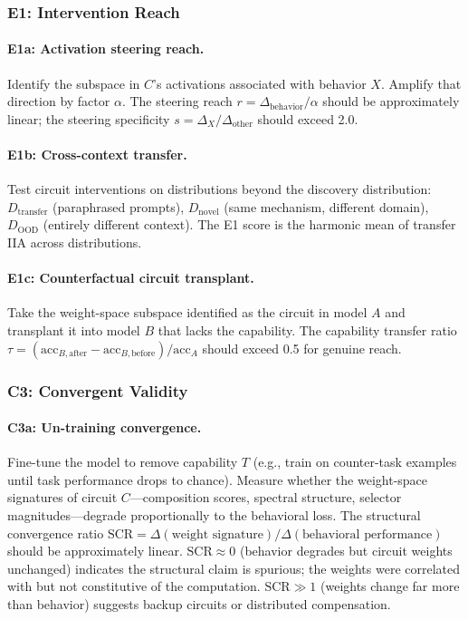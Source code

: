 \documentclass{article}
\begin{document}
\subsubsection{E1: Intervention Reach}

\paragraph{E1a: Activation steering reach.} Identify the subspace in $C$'s activations associated with behavior $X$. Amplify that direction by factor $\alpha$. The steering reach $r = \Delta_{\text{behavior}} / \alpha$ should be approximately linear; the steering specificity $s = \Delta_X / \Delta_{\text{other}}$ should exceed 2.0.

\paragraph{E1b: Cross-context transfer.} Test circuit interventions on distributions beyond the discovery distribution: $D_{\text{transfer}}$ (paraphrased prompts), $D_{\text{novel}}$ (same mechanism, different domain), $D_{\text{OOD}}$ (entirely different context). The E1 score is the harmonic mean of transfer IIA across distributions.

\paragraph{E1c: Counterfactual circuit transplant.} Take the weight-space subspace identified as the circuit in model $A$ and transplant it into model $B$ that lacks the capability. The capability transfer ratio $\tau = (\text{acc}_{B,\text{after}} - \text{acc}_{B,\text{before}}) / \text{acc}_A$ should exceed 0.5 for genuine reach.

\subsubsection{C3: Convergent Validity}

\paragraph{C3a: Un-training convergence.} Fine-tune the model to remove capability $T$ (e.g., train on counter-task examples until task performance drops to chance). Measure whether the weight-space signatures of circuit $C$---composition scores, spectral structure, selector magnitudes---degrade proportionally to the behavioral loss. The structural convergence ratio $\text{SCR} = \Delta(\text{weight signature}) / \Delta(\text{behavioral performance})$ should be approximately linear. $\text{SCR} \approx 0$ (behavior degrades but circuit weights unchanged) indicates the structural claim is spurious; the weights were correlated with but not constitutive of the computation. $\text{SCR} \gg 1$ (weights change far more than behavior) suggests backup circuits or distributed compensation.
\end{document}

